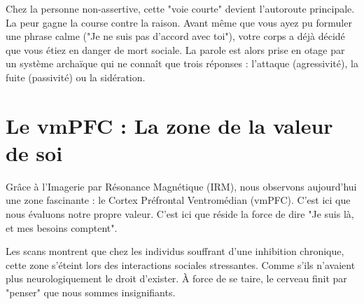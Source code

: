 \documentclass[11.5pt,a4paper]{article}
\begin{document}
Chez la personne non-assertive, cette "voie courte" devient l'autoroute principale. La peur gagne la course contre la raison. Avant même que vous ayez pu formuler une phrase calme ("Je ne suis pas d'accord avec toi"), votre corps a déjà décidé que vous étiez en danger de mort sociale. La parole est alors prise en otage par un système archaïque qui ne connaît que trois réponses : l'attaque (agressivité), la fuite (passivité) ou la sidération.

\section{Le vmPFC : La zone de la valeur de soi}
Grâce à l'Imagerie par Résonance Magnétique (IRM), nous observons aujourd'hui une zone fascinante : le Cortex Préfrontal Ventromédian (vmPFC). C'est ici que nous évaluons notre propre valeur. C'est ici que réside la force de dire "Je suis là, et mes besoins comptent". 

Les scans montrent que chez les individus souffrant d'une inhibition chronique, cette zone s'éteint lors des interactions sociales stressantes. Comme s'ils n'avaient plus neurologiquement le droit d'exister. À force de se taire, le cerveau finit par "penser" que nous sommes insignifiants.
\end{document}
